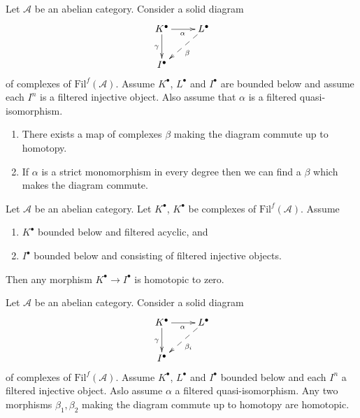 \begin{exercise}
\label{exercise-morphisms-lift}
Let $\mathcal{A}$ be an abelian category.
Consider a solid diagram
$$
\xymatrix{
K^\bullet \ar[r]_\alpha \ar[d]_\gamma & L^\bullet \ar@{-->}[dl]^\beta \\
I^\bullet
}
$$
of complexes of $\text{Fil}^f(\mathcal{A})$. Assume
$K^\bullet$, $L^\bullet$ and $I^\bullet$ are bounded below and
assume each $I^n$ is a filtered injective object.
Also assume that $\alpha$ is a filtered quasi-isomorphism.
\begin{enumerate}
\item There exists a map of complexes $\beta$ making the diagram
commute up to homotopy.
\item If $\alpha$ is a strict monomorphism in every degree
then we can find a $\beta$ which makes the diagram commute.
\end{enumerate}
\end{exercise}

\begin{exercise}
\label{exercise-acyclic-is-zero}
Let $\mathcal{A}$ be an abelian category.
Let $K^\bullet$, $K^\bullet$ be complexes of $\text{Fil}^f(\mathcal{A})$.
Assume
\begin{enumerate}
\item $K^\bullet$ bounded below and filtered acyclic, and
\item $I^\bullet$ bounded below and consisting of filtered injective objects.
\end{enumerate}
Then any morphism $K^\bullet \to I^\bullet$ is homotopic to zero.
\end{exercise}

\begin{exercise}
\label{exercise-morphisms-equal-up-to-homotopy}
Let $\mathcal{A}$ be an abelian category.
Consider a solid diagram
$$
\xymatrix{
K^\bullet \ar[r]_\alpha \ar[d]_\gamma & L^\bullet \ar@{-->}[dl]^{\beta_i} \\
I^\bullet
}
$$
of complexes of $\text{Fil}^f(\mathcal{A})$.
Assume $K^\bullet$, $L^\bullet$ and $I^\bullet$ bounded below and
each $I^n$ a filtered injective
object. Aslo assume $\alpha$ a filtered quasi-isomorphism.
Any two morphisms $\beta_1, \beta_2$ making the diagram commute
up to homotopy are homotopic.
\end{exercise}


















